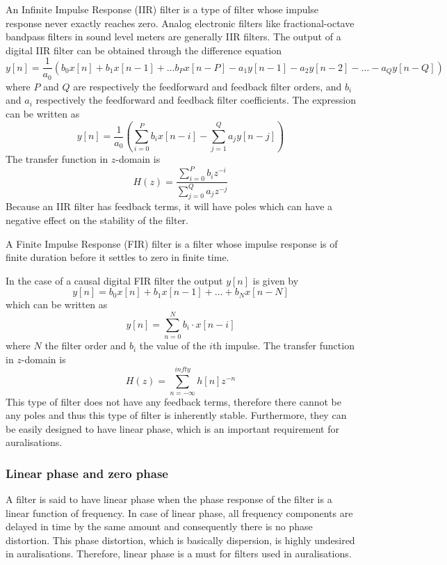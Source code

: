 An Infinite Impulse Response (IIR) filter is a type of filter whose impulse response never exactly reaches zero. Analog electronic filters like fractional-octave bandpass filters in sound level meters are generally IIR filters.
The output of a digital IIR filter can be obtained through the difference equation
\begin{equation}
 y[n] = \frac{1}{a_0} \left( b_0 x[n] + b_1 x[n-1] + \dots b_P x[n-P] - a_1 y[n-1] - a_2 y[n-2] - \dots - a_Q y[n-Q]\right)
\end{equation}
where $P$ and $Q$ are respectively the feedforward and feedback filter orders, and $b_i$ and $a_i$ respectively the feedforward and feedback filter coefficients.
The expression can be written as
\begin{equation}
 y[n] = \frac{1}{a_0} \left( \sum_{i=0}^{P} b_i x[n-i] - \sum_{j=1}^Q a_j y[n-j] \right)
\end{equation}
The transfer function in $z$-domain is
\begin{equation}
 H(z) = \frac{\sum_{i=0}^P b_i z^{-i}}{\sum_{j=0}^Q a_j z^{-j}}
\end{equation}
Because an IIR filter has feedback terms, it will have poles which can have a negative effect on the stability of the filter.

A Finite Impulse Response (FIR) filter is a filter whose impulse response is of finite duration before it settles to zero in finite time.

In the case of a causal digital FIR filter the output $y[n]$ is given by
\begin{equation}
 y[n] = b_0 x[n] + b_1 x[n-1] + \dots + b_N x[n-N]
\end{equation}
which can be written as
\begin{equation}
 y[n] = \sum_{n=0}^{N} b_i \cdot x[n-i]
\end{equation}
where $N$ the filter order and $b_i$ the value of the $i$th impulse.
The transfer function in $z$-domain is
\begin{equation}
H(z) = \sum_{n=-\infty}^{infty} h[n] z^{-n}
\end{equation}
This type of filter does not have any feedback terms, therefore there cannot be any poles and thus this type of filter is inherently stable.
Furthermore, they can be easily designed to have linear phase, which is an important requirement for auralisations.

\subsubsection{Linear phase and zero phase}\label{sec:theory:signal-processing:linear-phase}
A filter is said to have linear phase when the phase response of the filter is a 
linear function of frequency. In case of linear phase, all frequency components 
are delayed in time by the same amount and consequently there is no phase 
distortion. This phase distortion, which is basically dispersion, is highly 
undesired in auralisations. Therefore, linear phase is a must for filters used 
in auralisations. 

